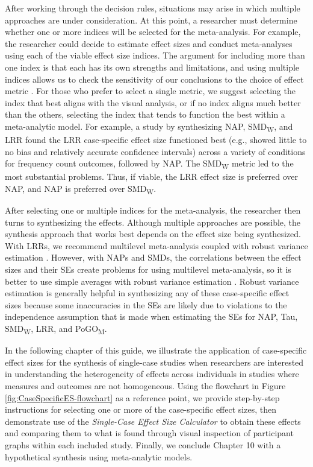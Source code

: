 \documentclass[
]{book}
\begin{document}
After working through the decision rules, situations may arise in which multiple approaches are under consideration. At this point, a researcher must determine whether one or more indices will be selected for the meta-analysis. For example, the researcher could decide to estimate effect sizes and conduct meta-analyses using each of the viable effect size indices. The argument for including more than one index is that each has its own strengths and limitations, and using multiple indices allows us to check the sensitivity of our conclusions to the choice of effect metric \citep{Kratochwill2010single}. For those who prefer to select a single metric, we suggest selecting the index that best aligns with the visual analysis, or if no index aligns much better than the others, selecting the index that tends to function the best within a meta-analytic model. For example, a study by \citet{Chen_Pustejovsky_2022} synthesizing NAP, SMD\textsubscript{W}, and LRR found the LRR case-specific effect size functioned best (e.g., showed little to no bias and relatively accurate confidence intervals) across a variety of conditions for frequency count outcomes, followed by NAP. The SMD\textsubscript{W} metric led to the most substantial problems. Thus, if viable, the LRR effect size is preferred over NAP, and NAP is preferred over SMD\textsubscript{W}.

After selecting one or multiple indices for the meta-analysis, the researcher then turns to synthesizing the effects. Although multiple approaches are possible, the synthesis approach that works best depends on the effect size being synthesized. With LRRs, we recommend multilevel meta-analysis coupled with robust variance estimation \citep{Chen_Pustejovsky_2022}. However, with NAPs and SMDs, the correlations between the effect sizes and their SEs create problems for using multilevel meta-analysis, so it is better to use simple averages with robust variance estimation \citep{Chen_Pustejovsky_2022}. Robust variance estimation is generally helpful in synthesizing any of these case-specific effect sizes because some inaccuracies in the SEs are likely due to violations to the independence assumption that is made when estimating the SEs for NAP, Tau, SMD\textsubscript{W}, LRR, and PoGO\textsubscript{M}.

In the following chapter of this guide, we illustrate the application of case-specific effect sizes for the synthesis of single-case studies when researchers are interested in understanding the heterogeneity of effects across individuals in studies where measures and outcomes are not homogeneous. Using the flowchart in Figure \ref{fig:CaseSpecificES-flowchart} as a reference point, we provide step-by-step instructions for selecting one or more of the case-specific effect sizes, then demonstrate use of the \emph{Single-Case Effect Size Calculator} \citep{pustejovsky2023SingleCaseES} to obtain these effects and comparing them to what is found through visual inspection of participant graphs within each included study. Finally, we conclude Chapter 10 with a hypothetical synthesis using meta-analytic models.
\end{document}
